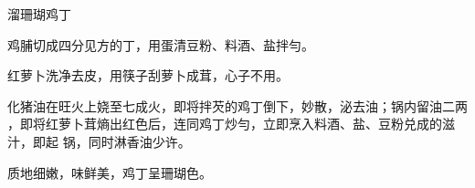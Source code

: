 \begin{recipe}{溜珊瑚鸡丁}

\ingredients


\cooking

\step 鸡脯切成四分见方的丁，用蛋清豆粉、料酒、盐拌勻。

\step 红萝卜洗净去皮，用筷子刮萝卜成茸，心子不用。

\step 化猪油在旺火上娆至七成火，即将拌芡的鸡丁倒下，妙散，泌去油；锅内留油二两
，即将红萝卜茸熵出红色后，连同鸡丁炒勻，立即烹入料酒、盐、豆粉兑成的滋汁，即起
锅，同时淋香油少许。

\notes

质地细嫩，味鲜美，鸡丁呈珊瑚色。

\end{recipe}

